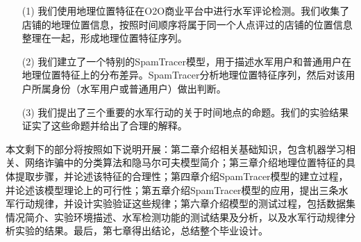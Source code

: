 \begin{enumerate}
	\item[(1)] 我们使用地理位置特征在O2O商业平台中进行水军评论检测。我们收集了店铺的地理位置信息，按照时间顺序将属于同一个人点评过的店铺的位置信息整理在一起，形成地理位置特征序列。
	\item[(2)]  我们建立了一个特别的SpamTracer模型，用于描述水军用户和普通用户在地理位置特征上的分布差异。SpamTracer分析地理位置特征序列，然后对该用户所属身份（水军用户或普通用户）做出判断。
	\item[(3)]  我们提出了三个重要的水军行动的关于时间地点的命题。我们的实验结果证实了这些命题并给出了合理的解释。
\end{enumerate}

本文剩下的部分将按照如下说明开展：第二章介绍相关基础知识，包含机器学习相关、网络诈骗中的分类算法和隐马尔可夫模型简介；第三章介绍地理位置特征的具体提取步骤，并论述该特征的合理性；第四章介绍SpamTracer模型的建立过程，并论述该模型理论上的可行性；第五章介绍SpamTracer模型的应用，提出三条水军行动规律，并设计实验验证这些规律；第六章介绍模型的测试过程，包括数据集情况简介、实验环境描述、水军检测功能的测试结果及分析，以及水军行动规律分析实验的结果。最后，第七章得出结论，总结整个毕业设计。





